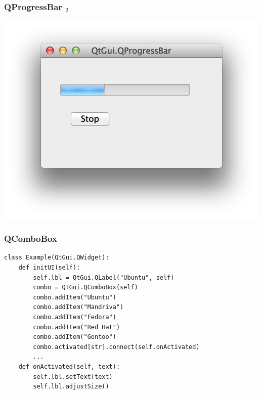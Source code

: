 \documentclass[utf8,compress]{beamer}
\begin{document}
\begin{frame}[fragile]
  \frametitle{QProgressBar $_2$}
\begin{center}
\includegraphics[scale=0.5]{pyqt15.png}
\end{center}
\end{frame}

\begin{frame}
  \frametitle{QComboBox}
\begin{verbatim}
class Example(QtGui.QWidget):
    def initUI(self):
        self.lbl = QtGui.QLabel("Ubuntu", self)
        combo = QtGui.QComboBox(self)
        combo.addItem("Ubuntu")
        combo.addItem("Mandriva")
        combo.addItem("Fedora")
        combo.addItem("Red Hat")
        combo.addItem("Gentoo")
        combo.activated[str].connect(self.onActivated)        
        ...
    def onActivated(self, text):
        self.lbl.setText(text)
        self.lbl.adjustSize()  
\end{verbatim}
\end{frame}
\end{document}
